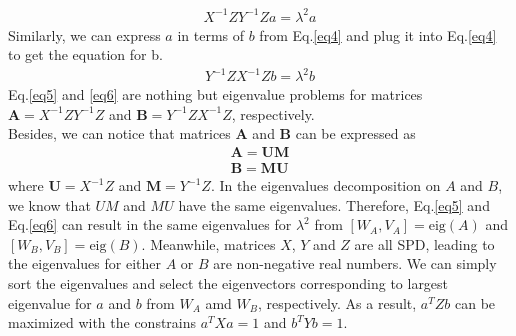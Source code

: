 \documentclass[11pt]{article}
\newcommand{\mtx}[1]{\mathbf{#1}}
\def \mA {\mtx{A}}
\def \mU {\mtx{U}}
\begin{document}
\begin{align}\label{eq5}
X^{-1}ZY^{-1}Za=\lambda^2a
\end{align}
Similarly, we can express $a$ in terms of $b$ from Eq.\ref{eq4} and plug it into Eq.\ref{eq4} to get the equation for b.
\begin{align}\label{eq6}
Y^{-1}ZX^{-1}Zb=\lambda^2b
\end{align}
Eq.\ref{eq5} and \ref{eq6} are nothing but eigenvalue problems for matrices $\mtx{A}=X^{-1}ZY^{-1}Z$ and $\mtx{B}=Y^{-1}ZX^{-1}Z$, respectively.\\
Besides, we can notice that matrices $\mA$ and $\mtx{B}$ can be expressed as
\begin{align*}
\mA=\mU\mtx{M}\\
\mtx{B}=\mtx{M}\mU
\end{align*}
where $\mU=X^{-1}Z$ and $\mtx{M}=Y^{-1}Z$. In the eigenvalues decomposition on $A$ and $B$, we know that $UM$ and $MU$ have the same eigenvalues. Therefore, Eq.\ref{eq5} and Eq.\ref{eq6} can result in the same eigenvalues for $\lambda^2$ from $[W_A,V_A]=\text{eig}(A)$ and $[W_B,V_B]=\text{eig}(B)$. Meanwhile, matrices $X$, $Y$ and $Z$ are all SPD, leading to the eigenvalues for either $A$ or $B$ are non-negative real numbers. We can simply sort the eigenvalues and select the eigenvectors corresponding to largest eigenvalue for $a$ and $b$ from $W_A$ amd $W_B$, respectively. As a result, $a^TZb$ can be maximized with the constrains $a^TXa=1$ and $b^TYb=1$.
\end{document}
